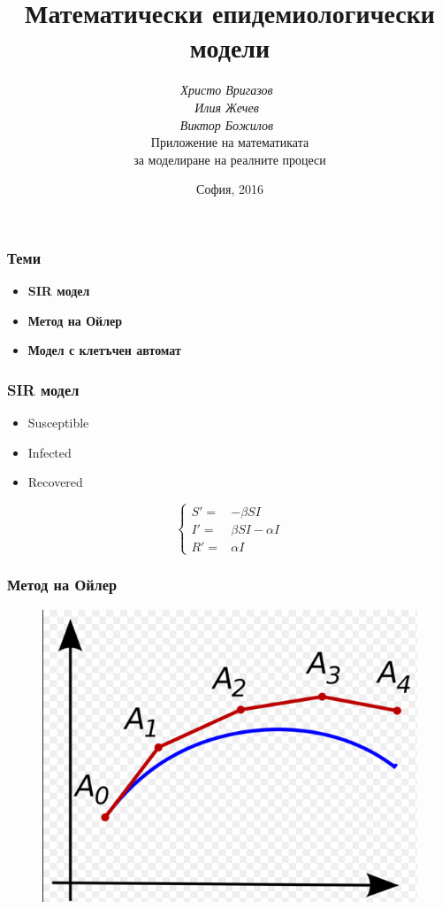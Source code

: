 \documentclass[14pt]{beamer}
\title{\small{Математически епидемиологически модели}}
\author{\small{%
\emph{Христо Вригазов}~\\%
\emph{Илия Жечев}~\\%
\emph{Виктор Божилов}~}\\%
\vspace{30pt}%
Приложение на математиката\\
за моделиране на реалните процеси%
\vspace{20pt}%
}
\date{\small{София, 2016}}
\begin{document}
\maketitle

\begin{frame}
\frametitle{Теми}
\begin{itemize}
  \item \textbf{SIR модел}
  \item \textbf{Метод на Ойлер}
  \item \textbf{Модел с клетъчен автомат}
\end{itemize}
\end{frame}

\begin{frame}
\frametitle{SIR модел}
\begin{itemize}
  \item Susceptible
  \item Infected
  \item Recovered
\end{itemize}
$$
\left\{
  \begin{array}{rl}
    S' = & - \beta SI \\
    I' = & \beta SI - \alpha I \\
    R' = & \alpha I
  \end{array}
\right.
$$
\end{frame}

\begin{frame}
\frametitle{Метод на Ойлер}
    \begin{figure}[H]
      \center
      \includegraphics[width=0.8\linewidth]{Euler}
    \end{figure}
\end{frame}
\end{document}
